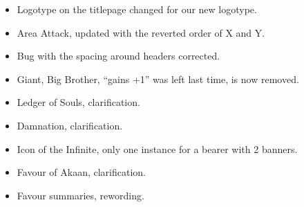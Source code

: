 \subtitle{0.205.2}

\begin{itemize}
\item Logotype on the titlepage changed for our new logotype.
\item Area Attack, updated with the reverted order of X and Y.
\item Bug with the spacing around headers corrected.
\item Giant, Big Brother, \enquote{gains +1} was left last time, is now removed.
\item Ledger of Souls, clarification.
\item Damnation, clarification.
\item Icon of the Infinite, only one instance for a bearer with 2 banners.
\item Favour of Akaan, clarification.
\item Favour summaries, rewording.
\end{itemize}
